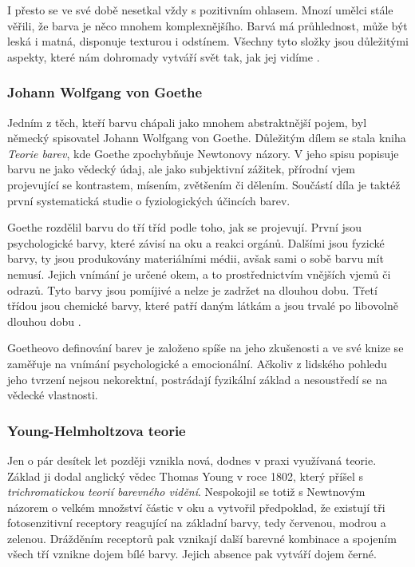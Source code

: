 I přesto se ve své době nesetkal vždy s pozitivním ohlasem. Mnozí umělci stále věřili, 
že barva je něco mnohem komplexnějšího. Barvá má průhlednost, může být leská i matná, disponuje texturou i odstínem. Všechny tyto složky jsou důležitými aspekty, 
které nám dohromady vytváří svět tak, jak jej vidíme \cite{gage2023colour}.

\subsubsection{Johann Wolfgang von Goethe}
Jedním z těch, kteří barvu chápali jako mnohem abstraktnější pojem, byl německý spisovatel Johann Wolfgang von Goethe. Důležitým dílem se stala kniha \emph{Teorie barev}, kde Goethe zpochybňuje
Newtonovy názory. V jeho spisu popisuje barvu ne jako vědecký údaj, ale jako subjektivní zážitek, přírodní vjem projevující se kontrastem, mísením, zvětšením či dělením.
Součástí díla je taktéž první systematická studie o fyziologických účincích barev. 

Goethe rozdělil barvu do tří tříd podle toho, jak
se projevují. První jsou psychologické barvy, které závisí na oku a reakci orgánů. Dalšími jsou fyzické barvy, ty jsou produkovány materiálními médii, avšak sami o sobě barvu mít nemusí. Jejich vnímání je určené okem, a to 
prostřednictvím vnějších vjemů či odrazů. Tyto barvy jsou pomíjivé a nelze je zadržet na dlouhou dobu. Třetí třídou jsou chemické barvy, které patří daným látkám a jsou trvalé po libovolně dlouhou dobu \cite{goethe1840}.


Goetheovo definování barev je založeno spíše na jeho zkušenosti a ve své knize se zaměřuje na vnímání psychologické a emocionální.
Ačkoliv z lidského pohledu jeho tvrzení nejsou nekorektní, postrádají fyzikální základ a nesoustředí se na vědecké vlastnosti. 

\subsubsection{Young-Helmholtzova teorie}
Jen o pár desítek let později vznikla nová, dodnes v praxi využívaná teorie. Základ ji dodal anglický vědec Thomas Young v roce 1802, který
příšel s \emph{trichromatickou teorií barevného vidění}. Nespokojil se totiž s Newtnovým názorem o velkém množství částic v oku a vytvořil
předpoklad, že existují tři fotosenzitivní receptory reagující na základní barvy, tedy červenou, modrou a zelenou. Drážděním receptorů pak 
vznikají další barevné kombinace a spojením všech tří vznikne dojem bílé barvy. Jejich absence pak vytváří dojem černé.

